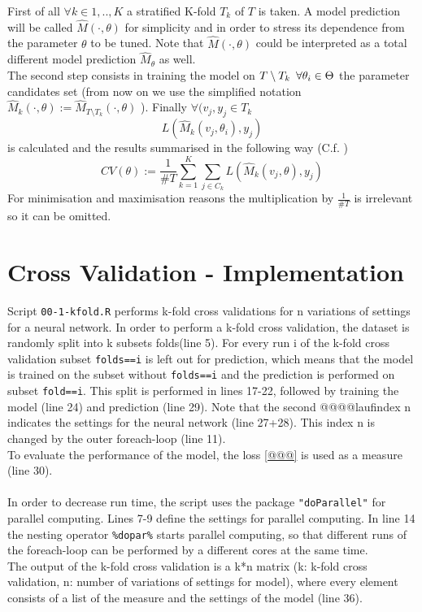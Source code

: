 \documentclass[a4paper,12pt]{article}
\begin{document}
First of all $\forall k \in 1, ..,K$ a stratified K-fold $T_{k}$ of $T$ is taken. A model prediction will be called $ \hat{M}(\cdot,\theta)$ for simplicity and in order to stress its dependence from the parameter $\theta$ to be tuned.
Note that $\hat{M}(\cdot,\theta)$ could be interpreted as a total different model prediction $\hat{M}_{\theta}$ as well.\\
The second step consists in training the model on $T \setminus T_{k} \enskip \forall \theta_{i} \in \Theta $ the parameter candidates set (from now on we use the simplified notation $ \hat{M}_{k}(\cdot,\theta):=\hat{M}_{T \setminus T_{k}}(\cdot,\theta)$ ).
Finally $\forall (v_{j},y_{j} \in T_{k} $  $$ L(\hat{M}_{k}(v_{j},\theta_{i}),y_{j})$$ is calculated and the results summarised in the following way (C.f. \cite{tibshirani2009} ) $$ CV(\theta):= \frac{1}{\#T} \sum_{k=1}^{K} \sum_{j \in C_{k}} L(\hat{M}_{k}(v_{j},\theta),y_{j})$$
For minimisation and maximisation reasons the multiplication by $\frac{1}{\# T}$ is irrelevant so it can be omitted.

\section{Cross Validation - Implementation}


Script \texttt{00-1-kfold.R} performs k-fold cross validations for n variations of settings for a neural network. In order to perform a k-fold cross validation, the dataset is randomly split into k subsets folds(line 5). For every run i of the k-fold cross validation subset \texttt{folds==i} is left out for prediction, which means that the model is trained on the subset without \texttt{folds==i} and the prediction is performed on subset \texttt{fold==i}. This split is performed in lines 17-22, followed by training the model (line 24) and prediction (line 29). Note that the second @@@@laufindex n indicates the settings for the neural network (line 27+28). This index n is changed by the outer foreach-loop (line 11). \\
To evaluate the performance of the model, the loss \ref{@@@} is used as a measure (line 30). \\
\\
In order to decrease run time, the script uses the package \texttt{"doParallel"} for parallel computing. Lines 7-9 define the settings for parallel computing. In line 14 the nesting operator \texttt{\%dopar\%} starts parallel computing, so that different runs of the foreach-loop can be performed by a different cores at the same time.\\ 
The output of the k-fold cross validation is a k*n matrix (k: k-fold cross validation, n: number of variations of settings for model), where every element consists of a list  of the measure and the settings of the model (line 36). \\
\end{document}
